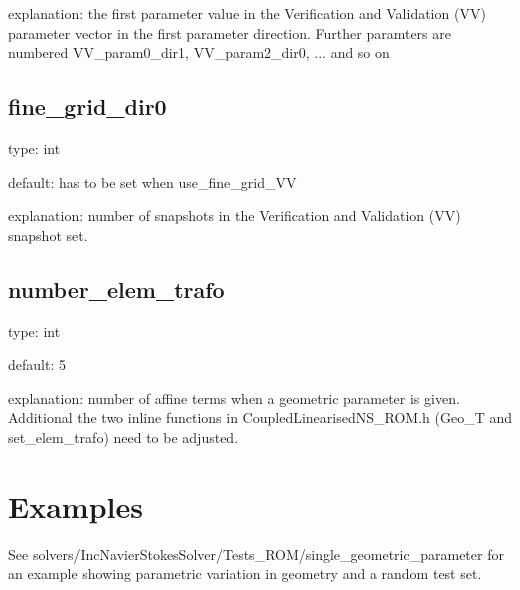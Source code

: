 \documentclass[a4paper,10pt]{article}
\begin{document}
\noindent explanation: the first parameter value in the Verification and Validation (VV) parameter vector in the first parameter direction. Further paramters are numbered VV\_param0\_dir1, VV\_param2\_dir0, ... and so on

\subsection{fine\_grid\_dir0}

\noindent type: int

\noindent default: has to be set when use\_fine\_grid\_VV

\noindent explanation: number of snapshots in the Verification and Validation (VV) snapshot set. 

\subsection{number\_elem\_trafo}

\noindent type: int

\noindent default: 5

\noindent explanation: number of affine terms when a geometric parameter is given. Additional the two inline functions in CoupledLinearisedNS\_ROM.h (Geo\_T and set\_elem\_trafo) need to be adjusted. 




\section{Examples}

See solvers/IncNavierStokesSolver/Tests\_ROM/single\_geometric\_parameter for an example showing parametric variation in geometry and a random test set.
\end{document}
